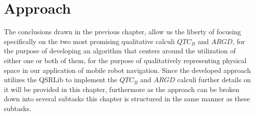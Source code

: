 
\chapter{Approach}
The conclusions drawn in the previous chapter, allow us the liberty of focusing specifically on the two most promising qualitative calculi $QTC_B$ and $ARGD$, for the purpose of developing an algorithm that centers around the utilization of either one or both of them, for the purpose of qualitatively representing physical space in our application of mobile robot navigation. Since the developed approach utilizes the QSRLib to implement the $QTC_B$ and $ARGD$ calculi further details on it will be provided in this chapter, furthermore as the approach can be broken down into several subtasks this chapter is structured in the same manner as these subtasks.


